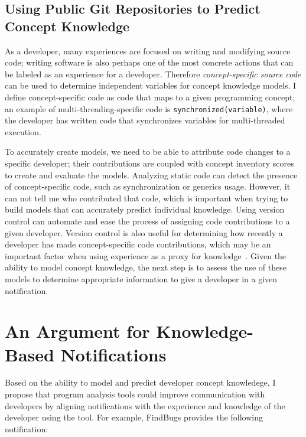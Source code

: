 \documentclass{llncs}
\begin{document}

\subsection{Using Public Git Repositories to Predict Concept Knowledge}
As a developer, many experiences are focused on writing and modifying source code; writing software is also perhaps one of the most concrete actions that can be labeled as an experience for a developer. Therefore \emph{concept-specific source code} can be used to determine independent variables for concept knowledge models. I define concept-specific code as code that maps to a given programming concept; an example of multi-threading-specific code is \texttt{synchronized(variable)}, where the developer has written code that synchronizes variables for multi-threaded execution.

To accurately create models, we need to be able to attribute code changes to a specific developer; their contributions are coupled with concept inventory scores to create and evaluate the models. Analyzing static code can detect the presence of concept-specific code, such as synchronization or generics usage. However, it can not tell me who contributed that code, which is important when trying to build models that can accurately predict individual knowledge. 
Using version control can automate and ease the process of assigning code contributions to a given developer. 
Version control is also useful for determining how recently a developer has made concept-specific code contributions, which may be an important factor when using experience as a proxy for knowledge~\cite{johnson2015bespoke}. %
Given the ability to model concept knowledge, the next step is to assess the use of these models to determine appropriate information to give a developer in a given notification.


\section{An Argument for Knowledge-Based Notifications}
Based on the ability to model and predict developer concept knowledege, I propose that program analysis tools could improve communication with developers by aligning notifications with the experience and knowledge of the developer using the tool.
For example, FindBugs provides the following notification:
\end{document}

